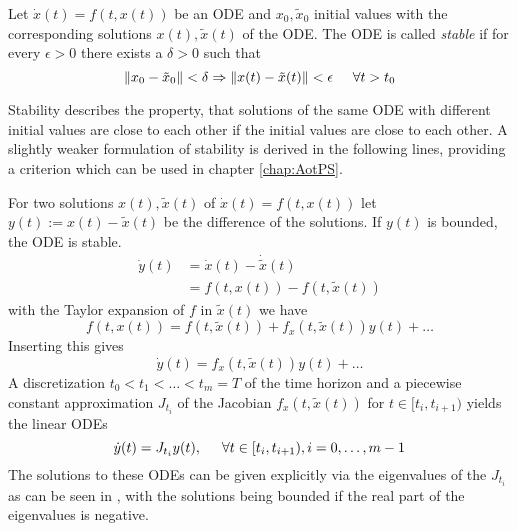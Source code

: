 \documentclass[a4paper, 12pt]{scrreprt} %
\begin{document}
\begin{definition}[Stability]
Let $\dot x(t) = f\left(t,x(t)\right)$ be an \ac{ODE} and $x_0, \tilde{x}_0$ initial values with the corresponding solutions $x(t), \tilde{x}(t)$ of the \ac{ODE}. The \ac{ODE} is called \emph{stable} if for every $\epsilon > 0$ there exists a $\delta > 0$ such that
\begin{equation}
\Vert x_0 - \tilde{x}_0 \Vert < \delta \Rightarrow \Vert x(t) - \tilde{x}(t) \Vert < \epsilon \hspace{0.5cm} \forall t > t_0
\label{eq:Stab}
\end{equation}
\end{definition}

Stability describes the property, that solutions of the same \ac{ODE} with different initial values are close to each other if the initial values are close to each other. A slightly weaker formulation of stability is derived in the following lines, providing a criterion which can be used in chapter \ref{chap:AotPS}.

For two solutions $x(t), \tilde{x}(t)$ of $\dot x(t) = f\left(t,x(t)\right)$ let $y(t) := x(t) - \tilde{x}(t)$ be the difference of the solutions. If $y(t)$ is bounded, the \ac{ODE} is stable.
\begin{align*}
\dot{y}(t) &= \dot{x}(t) - \dot{\tilde{x}}(t) \\
 &= f\left(t,x(t)\right) - f\left(t,\tilde{x}(t)\right)
\end{align*}
with the Taylor expansion of $f$ in $\tilde{x}(t)$ we have 
\begin{equation*}
f(t,x(t)) = f(t,\tilde{x}(t)) + f_x(t,\tilde{x}(t)) y(t) + \dots
\end{equation*}
Inserting this gives
\begin{equation}
\dot{y}(t) = f_x(t,\tilde{x}(t)) y(t) + \dots
\label{eq:ODEStab}
\end{equation}
A discretization $t_0 < t_1 < \dots < t_m = T$ of the time horizon and a piecewise constant approximation $J_{t_i}$ of the Jacobian $f_x(t,\tilde{x}(t))$ for $t \in [t_i,t_{i+1})$ yields the linear \acp{ODE} 
\begin{equation*}
\dot y(t) = J_{t_i} y(t), \hspace{0.5cm} \forall t \in [t_i, t_{i+1}), i = 0, \dots, m-1
\end{equation*}
The solutions to these \acp{ODE} can be given explicitly via the eigenvalues of the $J_{t_i}$ as can be seen in \cite{sodei}, with the solutions being bounded if the real part of the eigenvalues is negative. 
\end{document}
